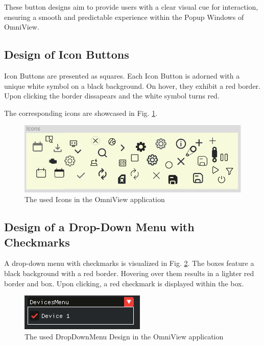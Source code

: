\documentclass{scrreprt}
\begin{document}
These button designs aim to provide users with a clear visual cue for interaction, ensuring a smooth and predictable experience within the Popup Windows of OmniView.

\subsection{Design of Icon Buttons}\label{cap:Designprinciples_IconButtons}

Icon Buttons are presented as squares. Each Icon Button is adorned with a unique white symbol on a black background. On hover, they exhibit a red border. Upon clicking the border dissapears and the white symbol turns red. 


The corresponding icons are showcased in Fig. \ref{fig: IconImages}.

\begin{figure}
    \includegraphics[width=.7\textwidth]{assets/pictures/Icons.png}
    \caption[]{The used Icons in the OmniView application}
    \label{fig: IconImages}
\end{figure}



\subsection{Design of a Drop-Down Menu with Checkmarks}\label{cap:Designprinciples_dropDownMenusWithCheckmark}

A drop-down menu with checkmarks is visualized in Fig. \ref{fig: DragandDropwithCheckmarks}. The boxes feature a black background with a red border. Hovering over them results in a lighter red border and box. Upon clicking, a red checkmark is displayed within the box.

\begin{figure}
    \includegraphics[width=.5\textwidth]{assets/pictures/DropDownMenu.png}
    \caption[]{The used DropDownMenu Design in the OmniView application}
    \label{fig: DragandDropwithCheckmarks}
\end{figure}
\end{document}
